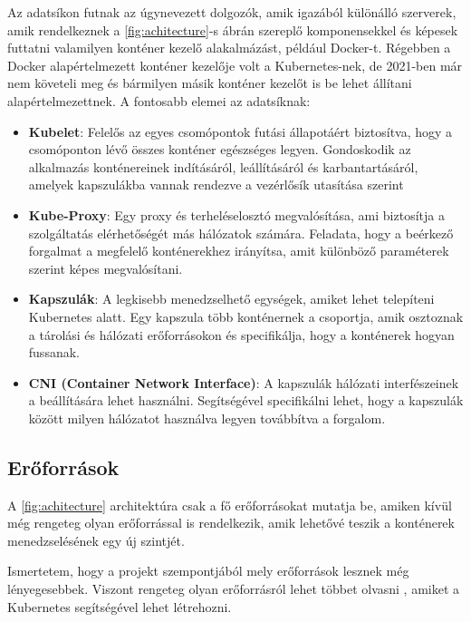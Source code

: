 Az adatsíkon futnak az úgynevezett dolgozók, amik igazából különálló szerverek,
amik rendelkeznek a \ref{fig:achitecture}-s ábrán szereplő komponensekkel és képesek 
futtatni valamilyen konténer kezelő alakalmázást, például Docker-t. Régebben a Docker
alapértelmezett konténer kezelője volt a Kubernetes-nek, de 2021-ben már nem követeli meg 
és bármilyen másik konténer kezelőt is be lehet állítani alapértelmezettnek. A fontosabb 
elemei az adatsíknak:

\begin{itemize}
	\item \textbf{Kubelet}: Felelős az egyes csomópontok futási állapotáért biztosítva, 
	hogy a csomóponton lévő összes konténer egészséges legyen. Gondoskodik az alkalmazás
	konténereinek indításáról, leállításáról és karbantartásáról, amelyek kapszulákba 
	vannak rendezve a vezérlősík utasítása szerint
	\item \textbf{Kube-Proxy}: Egy proxy és terheléselosztó megvalósítása, ami biztosítja
	a szolgáltatás elérhetőségét más hálózatok számára. Feladata, hogy a beérkező
	forgalmat a megfelelő konténerekhez irányítsa, amit különböző paraméterek szerint 
	képes megvalósítani.
	\item \textbf{Kapszulák}: A legkisebb menedzselhető egységek, amiket lehet telepíteni
	Kubernetes alatt. Egy kapszula több konténernek a csoportja, amik osztoznak a tárolási
	és hálózati erőforrásokon és specifikálja, hogy a konténerek hogyan fussanak. 
	\item \textbf{CNI (Container Network Interface)}: A kapszulák hálózati interfészeinek
	a beállítására lehet használni. Segítségével specifikálni lehet, hogy a kapszulák között milyen hálózatot használva legyen továbbítva a forgalom. 
\end{itemize}

\subsection{Erőforrások}

A \ref{fig:achitecture} architektúra csak a fő erőforrásokat mutatja be, amiken kívül
még rengeteg olyan erőforrással is rendelkezik, amik lehetővé teszik a konténerek 
menedzselésének egy új szintjét. 

Ismertetem, hogy a projekt szempontjából mely erőforrások lesznek még lényegesebbek. 
Viszont rengeteg olyan erőforrásról lehet többet olvasni \cite{kubeAPI}, amiket a 
Kubernetes segítségével lehet létrehozni.   


